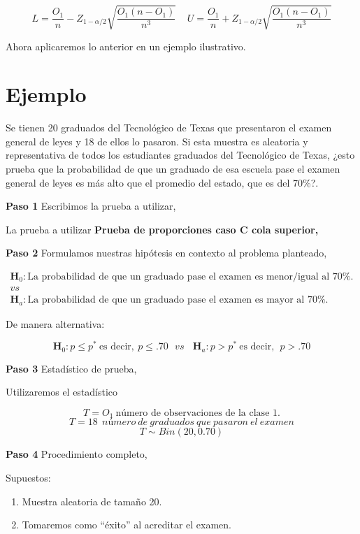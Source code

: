 \documentclass[
  a4paper,
  oneside,
  openany]{book}
\begin{document}
\[L=\frac{O_{1}}{n}-Z_{1-\alpha/2}\sqrt{\frac{O_{1}(n-O_{1})}{n^3}} \ \ \ \ \  U=\frac{O_{1}}{n}+Z_{1-\alpha/2}\sqrt{\frac{O_{1}(n-O_{1})}{n^3}}\]

Ahora aplicaremos lo anterior en un ejemplo ilustrativo.

\hypertarget{ejemplo}{%
\section{Ejemplo}\label{ejemplo}}

Se tienen 20 graduados del Tecnológico de Texas que presentaron el examen general de leyes y 18 de ellos lo pasaron. Si esta muestra es aleatoria y representativa de todos los estudiantes graduados del Tecnológico de Texas,
¿esto prueba que la probabilidad de que un graduado de esa escuela pase el examen general de leyes es más alto que el promedio del estado, que es del 70\%?.

\textbf{Paso 1} Escribimos la prueba a utilizar,

La prueba a utilizar \textbf{Prueba de proporciones caso C cola superior,}

\textbf{Paso 2} Formulamos nuestras hipótesis en contexto al problema planteado,

\[
\begin{array}{c}
\textbf{H}_{0}: \mbox{La probabilidad de que un graduado pase el examen es menor/igual al } 70\%.\\
vs\\
\textbf{H}_{a}: \mbox{La probabilidad de que un graduado pase el examen es mayor al }70\%.
\end{array}
\]

De manera alternativa:

\[\textbf{H}_{0}: p  \leq p^* \ \mbox{es decir},  \ p  \leq .70\ \ \  vs \ \ \ \ \textbf{H}_{a}: p >p^* \ \mbox{es decir}, \ \ p > .70\]

\textbf{Paso 3} Estadístico de prueba,

Utilizaremos el estadístico

\[T=O_{1} \ \mbox{número  de  observaciones  de  la clase 1.}\]
\[T=18 \ \ número\ de\ graduados\ que\ pasaron\ el\ examen\]
\[T\sim Bin(20,0.70)\]

\textbf{Paso 4} Procedimiento completo,

Supuestos:

\begin{enumerate}
\def\labelenumi{\arabic{enumi}.}
\item
  Muestra aleatoria de tamaño 20.
\item
  Tomaremos como ``éxito'' al acreditar el examen.
\end{enumerate}
\end{document}
